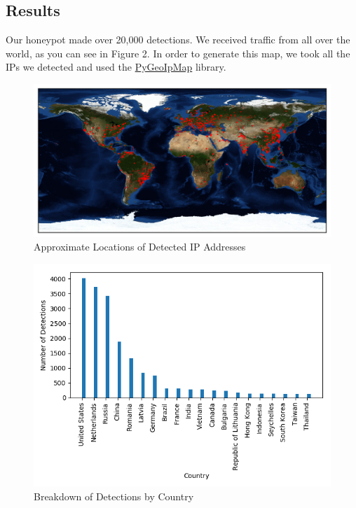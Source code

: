 \documentclass[a0,landscape]{a0poster}
\begin{document}
\begin{multicols}{3}
\section*{Results}
Our honeypot made over 20,000 detections. We received traffic from all over the world, as you can see in Figure 2. In order to generate this map, we took all the IPs we detected and used the \href{https://github.com/pieqq/PyGeoIpMap}{PyGeoIpMap} library.
\begin{figure}[H]
	\begin{center}
		\includegraphics[width=30cm]{map.png}
		\caption{Approximate Locations of Detected IP Addresses}
	\end{center}
\end{figure} 

\begin{figure}[H]
	\begin{center}
		\includegraphics[width=25cm]{top_countries.png}
		\caption{Breakdown of Detections by Country}
	\end{center}
\end{figure} 


\end{multicols}
\end{document}
